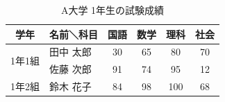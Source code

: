 \documentclass{ltjsarticle}
\begin{document}
\begin{table}[htbp]
  \caption{A大学 1年生の試験成績}
  \label{tab:score}
  \centering
  \begin{tabular}{|c|l||c|c|c|c|}
    \hline
    学年 & 名前＼科目 & 国語 & 数学 & 理科 & 社会 \\
    \hline \hline
    \multirow{2}{*}{1年1組}&田中 太郎 & 30 & 65 & 80 & 70 \\
    \cline{2-6}
    &佐藤 次郎 & 91 & 74 & 95 & 12 \\
    \hline
    1年2組&鈴木 花子 & 84 & 98 & 100 & 68 \\
    \hline
  \end{tabular}
\end{table}
\end{document}
